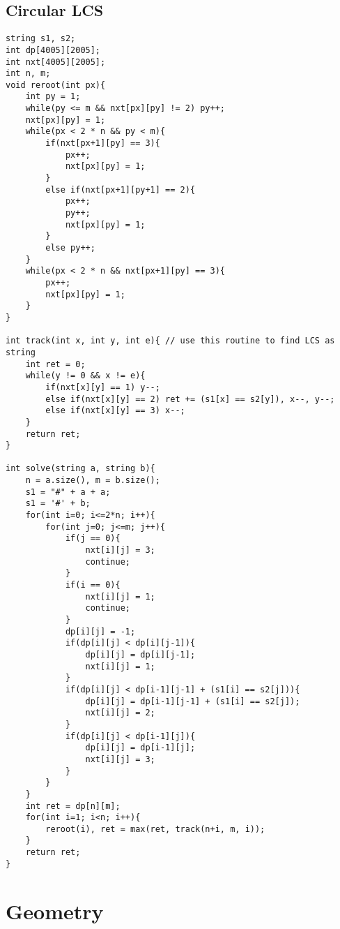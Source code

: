 \documentclass[landscape, 8pt, a4paper, oneside, twocolumn]{extarticle}
\begin{document}
\subsection{Circular LCS}
\begin{verbatim}
string s1, s2;
int dp[4005][2005];
int nxt[4005][2005];
int n, m;
void reroot(int px){
	int py = 1;
	while(py <= m && nxt[px][py] != 2) py++;
	nxt[px][py] = 1;
	while(px < 2 * n && py < m){
		if(nxt[px+1][py] == 3){
			px++;
			nxt[px][py] = 1;
		}
		else if(nxt[px+1][py+1] == 2){
			px++;
			py++;
			nxt[px][py] = 1;
		}
		else py++;
	}
	while(px < 2 * n && nxt[px+1][py] == 3){
		px++;
		nxt[px][py] = 1;
	}
}

int track(int x, int y, int e){ // use this routine to find LCS as string
	int ret = 0;
	while(y != 0 && x != e){
		if(nxt[x][y] == 1) y--;
		else if(nxt[x][y] == 2) ret += (s1[x] == s2[y]), x--, y--;
		else if(nxt[x][y] == 3) x--;
	}
	return ret;
}

int solve(string a, string b){
	n = a.size(), m = b.size();
	s1 = "#" + a + a;
	s1 = '#' + b;
	for(int i=0; i<=2*n; i++){
		for(int j=0; j<=m; j++){
			if(j == 0){
				nxt[i][j] = 3;
				continue;
			}
			if(i == 0){
				nxt[i][j] = 1;
				continue;
			}
			dp[i][j] = -1;
			if(dp[i][j] < dp[i][j-1]){
				dp[i][j] = dp[i][j-1];
				nxt[i][j] = 1;
			}
			if(dp[i][j] < dp[i-1][j-1] + (s1[i] == s2[j])){
				dp[i][j] = dp[i-1][j-1] + (s1[i] == s2[j]);
				nxt[i][j] = 2;
			}
			if(dp[i][j] < dp[i-1][j]){
				dp[i][j] = dp[i-1][j];
				nxt[i][j] = 3;
			}
		}
	}
	int ret = dp[n][m];
	for(int i=1; i<n; i++){
		reroot(i), ret = max(ret, track(n+i, m, i));
	}
	return ret;
}
\end{verbatim}
\section{Geometry}
\end{document}
